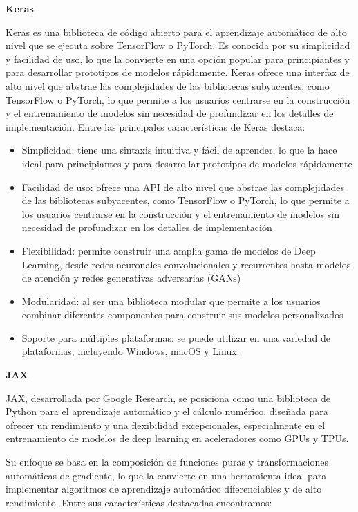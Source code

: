 \documentclass[
  a4paper,
  DIV=11,
  numbers=noendperiod]{scrreprt}
\providecommand{\tightlist}{%
  \setlength{\itemsep}{0pt}\setlength{\parskip}{0pt}}\usepackage{longtable,booktabs,array}
\begin{document}
\textbf{Keras}

Keras es una biblioteca de código abierto para el aprendizaje automático
de alto nivel que se ejecuta sobre TensorFlow o PyTorch. Es conocida por
su simplicidad y facilidad de uso, lo que la convierte en una opción
popular para principiantes y para desarrollar prototipos de modelos
rápidamente. Keras ofrece una interfaz de alto nivel que abstrae las
complejidades de las bibliotecas subyacentes, como TensorFlow o PyTorch,
lo que permite a los usuarios centrarse en la construcción y el
entrenamiento de modelos sin necesidad de profundizar en los detalles de
implementación. Entre las principales características de Keras destaca:

\begin{itemize}
\tightlist
\item
  Simplicidad: tiene una sintaxis intuitiva y fácil de aprender, lo que
  la hace ideal para principiantes y para desarrollar prototipos de
  modelos rápidamente
\item
  Facilidad de uso: ofrece una API de alto nivel que abstrae las
  complejidades de las bibliotecas subyacentes, como TensorFlow o
  PyTorch, lo que permite a los usuarios centrarse en la construcción y
  el entrenamiento de modelos sin necesidad de profundizar en los
  detalles de implementación
\item
  Flexibilidad: permite construir una amplia gama de modelos de Deep
  Learning, desde redes neuronales convolucionales y recurrentes hasta
  modelos de atención y redes generativas adversarias (GANs)
\item
  Modularidad: al ser una biblioteca modular que permite a los usuarios
  combinar diferentes componentes para construir sus modelos
  personalizados
\item
  Soporte para múltiples plataformas: se puede utilizar en una variedad
  de plataformas, incluyendo Windows, macOS y Linux.
\end{itemize}

\textbf{JAX}

JAX, desarrollada por Google Research, se posiciona como una biblioteca
de Python para el aprendizaje automático y el cálculo numérico, diseñada
para ofrecer un rendimiento y una flexibilidad excepcionales,
especialmente en el entrenamiento de modelos de deep learning en
aceleradores como GPUs y TPUs.

Su enfoque se basa en la composición de funciones puras y
transformaciones automáticas de gradiente, lo que la convierte en una
herramienta ideal para implementar algoritmos de aprendizaje automático
diferenciables y de alto rendimiento. Entre sus características
destacadas encontramos:
\end{document}
